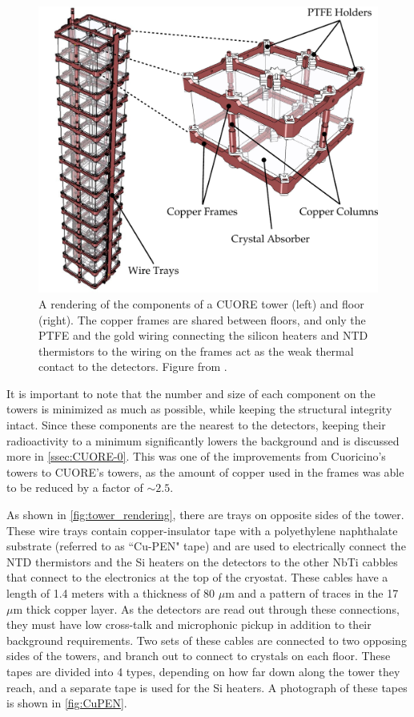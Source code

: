 \begin{figure}
    \centering
    \includegraphics[width=0.8\linewidth]{Figures/fig02.pdf}
    \caption[A rendering of the components of a single CUORE tower (left) and floor (right)]
    {A rendering of the components of a CUORE tower (left) and floor (right).
    The copper frames are shared between floors, and only the PTFE and the gold wiring connecting the silicon heaters and NTD thermistors to the wiring on the frames act as the weak thermal contact to the detectors.
    Figure from \cite{Alduino:2016vjd}.}
    \label{fig:tower_rendering}
\end{figure}
It is important to note that the number and size of each component on the towers is minimized as much as possible, while keeping the structural integrity intact.
Since these components are the nearest to the detectors, keeping their radioactivity to a minimum significantly lowers the background and is discussed more in \autoref{ssec:CUORE-0}.
This was one of the improvements from Cuoricino's towers to CUORE's towers, as the amount of copper used in the frames was able to be reduced by a factor of $\sim2.5$.

As shown in \autoref{fig:tower_rendering}, there are trays on opposite sides of the tower.
These wire trays contain copper-insulator tape with a polyethylene naphthalate substrate (referred to as ``Cu-PEN" tape) and are used to electrically connect the NTD thermistors and the Si heaters on the detectors to the other NbTi cabbles that connect to the electronics at the top of the cryostat.
These cables have a length of 1.4 meters with a thickness of 80 $\mu \textrm{m}$ and a pattern of traces in the 17 $\mu \textrm{m}$ thick copper layer.
As the detectors are read out through these connections, they must have low cross-talk and microphonic pickup in addition to their background requirements.
Two sets of these cables are connected to two opposing sides of the towers, and branch out to connect to crystals on each floor.
These tapes  are divided into 4 types, depending on how far down along the tower they reach, and a separate tape is used for the Si heaters.
A photograph of these tapes is shown in \autoref{fig:CuPEN}.

